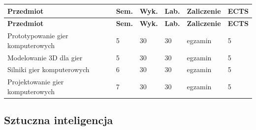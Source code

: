 \documentclass[12pt,a4paper]{article}
\newcommand{\thdrule}{\noalign{\global\setlength{\extrarowheight}{0pt}}}
\newcommand{\thdend}{\noalign{\global\setlength{\extrarowheight}{4pt}}}
\begin{document}
{\scriptsize
\begin{longtable}{m{6.5cm}m{0.7cm}m{1cm}m{1cm}m{1.7cm}m{0.7cm}}
\thdrule\toprule
\rowcolor{pjatkRed}
{\color{white}\footnotesize\textbf{\vphantom{Ag}Przedmiot}} & {\color{white}\footnotesize\textbf{\vphantom{Ag}Sem.}} & {\color{white}\footnotesize\textbf{\vphantom{Ag}Wyk.}} & {\color{white}\footnotesize\textbf{\vphantom{Ag}Lab.}} & {\color{white}\footnotesize\textbf{\vphantom{Ag}Zaliczenie}} & {\color{white}\footnotesize\textbf{\vphantom{Ag}ECTS}} \\
\midrule\thdend
\endfirsthead
\thdrule\toprule
\rowcolor{pjatkRed}
{\color{white}\footnotesize\textbf{\vphantom{Ag}Przedmiot}} & {\color{white}\footnotesize\textbf{\vphantom{Ag}Sem.}} & {\color{white}\footnotesize\textbf{\vphantom{Ag}Wyk.}} & {\color{white}\footnotesize\textbf{\vphantom{Ag}Lab.}} & {\color{white}\footnotesize\textbf{\vphantom{Ag}Zaliczenie}} & {\color{white}\footnotesize\textbf{\vphantom{Ag}ECTS}} \\
\midrule\thdend
\endhead
\rowcolor{tableRowLight} Prototypowanie gier komputerowych & 5 & 30 & 30 & {\scriptsize egzamin} & 5 \\
\rowcolor{tableRowAlt} Modelowanie 3D dla gier & 5 & 30 & 30 & {\scriptsize egzamin} & 5 \\
\rowcolor{tableRowLight} Silniki gier komputerowych & 6 & 30 & 30 & {\scriptsize egzamin} & 5 \\
\rowcolor{tableRowAlt} Projektowanie gier komputerowych & 7 & 30 & 30 & {\scriptsize egzamin} & 5 \\
\bottomrule
\end{longtable}}

\subsection*{Sztuczna inteligencja}
\end{document}
